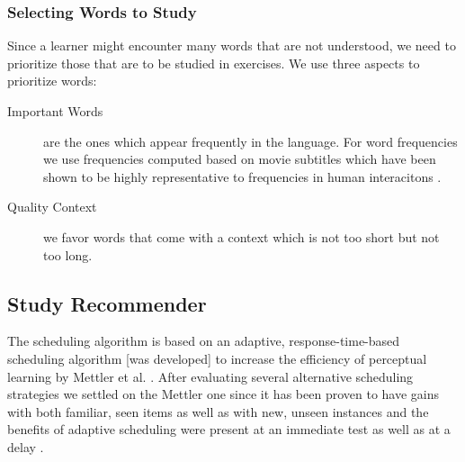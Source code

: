 \subsubsection{Selecting Words to Study}

Since a learner might encounter many words that are not understood, we need to prioritize those that are to be studied in exercises. We use three aspects to prioritize words: 


\begin{description}

  \item [Important Words] are the ones which appear frequently in the language. For word frequencies we use frequencies computed based on movie subtitles which have been shown to be highly representative to frequencies in human interacitons \cite{New07-subtitles}. 
  
  \item [Quality Context] we favor words that come with a context which is not too short but not too long. 

\end{description}

\subsection{Study Recommender}

The scheduling algorithm is based on an adaptive, response-time-based scheduling algorithm [was developed] to increase the efficiency of perceptual learning by Mettler et al. \cite{Mettler14-ARTS}. After evaluating several alternative scheduling strategies we settled on the Mettler one since it has been proven to have gains with both familiar, seen items as well as with new, unseen instances and the benefits of adaptive scheduling were present at an immediate test as well as at a delay \cite{Mettler14-ARTS}.
